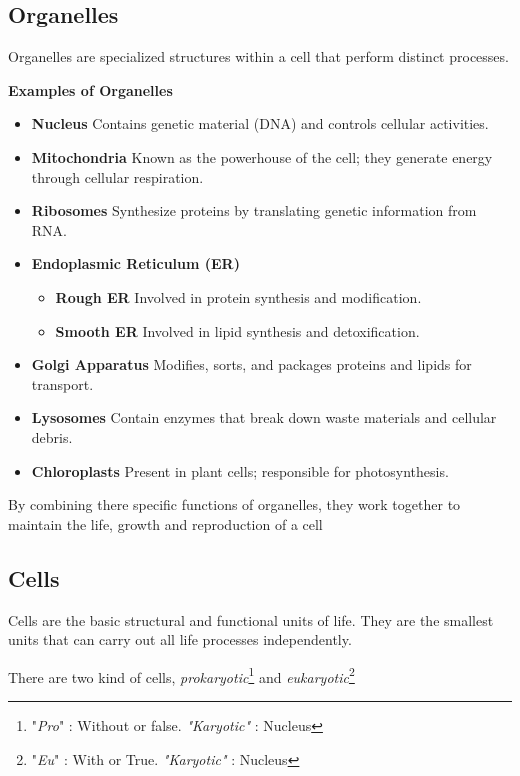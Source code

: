 \documentclass{article}
\begin{document}
\subsection{Organelles}
Organelles are specialized structures within a cell that perform distinct processes.

\textbf{Examples of Organelles}
\begin{itemize}
    \item \textbf{Nucleus} Contains genetic material (DNA) and controls cellular activities.
    \item \textbf{Mitochondria} Known as the powerhouse of the cell; they generate energy through cellular respiration.
    \item \textbf{Ribosomes} Synthesize proteins by translating genetic information from RNA.
    \item \textbf{Endoplasmic Reticulum (ER)}
    \begin{itemize}
        \item \textbf{Rough ER} Involved in protein synthesis and modification.
        \item \textbf{Smooth ER } Involved in lipid synthesis and detoxification.
    \end{itemize}
    \item \textbf{Golgi Apparatus} Modifies, sorts, and packages proteins and lipids for transport.
    \item \textbf{Lysosomes } Contain enzymes that break down waste materials and cellular debris.
    \item \textbf{Chloroplasts} Present in plant cells; responsible for photosynthesis.
    \cite{theeditorsofencyclopediabritanica_2023_structure}
\end{itemize}

By combining there specific functions of organelles, they work together to maintain the life, growth and reproduction of a cell

\subsection{Cells}
Cells are the basic structural and functional units of life. They are the smallest units that can carry out all life processes independently.

There are two kind of cells, \textit{prokaryotic}\footnote{"\textit{Pro}" : Without or false. \textit{"Karyotic"} : Nucleus} and \textit{eukaryotic}\footnote{"\textit{Eu}" : With or True. \textit{"Karyotic"} : Nucleus}
\end{document}
